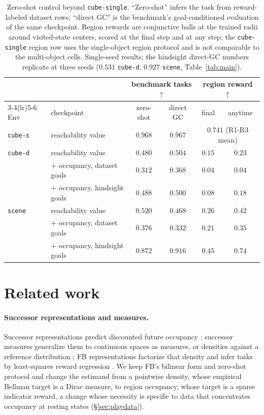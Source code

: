 \documentclass{article}
\begin{document}
\begin{table}[t]
\centering\small
\begin{tabular}{l l cc cc}
\toprule
& & \multicolumn{2}{c}{benchmark tasks $\uparrow$} & \multicolumn{2}{c}{region reward $\uparrow$} \\
\cmidrule(lr){3-4}\cmidrule(lr){5-6}
Env & checkpoint & zero-shot & direct GC & final & anytime \\
\midrule
\texttt{cube-s} & reachability value & $0.968$ & $0.967$ & \multicolumn{2}{c}{$0.741$ (R1-R3 mean)} \\
\midrule
\texttt{cube-d} & reachability value & $0.480$ & $0.504$ & $0.15$ & $0.23$ \\
& $+$ occupancy, dataset goals     & $0.312$ & $0.368$ & $0.04$ & $0.04$ \\
& $+$ occupancy, hindsight goals & $0.488$ & $0.500$ & $0.08$ & $0.18$ \\
\midrule
\texttt{scene} & reachability value & $0.520$ & $0.468$ & $0.26$ & $0.42$ \\
& $+$ occupancy, dataset goals     & $0.376$ & $0.332$ & $0.21$ & $0.35$ \\
& $+$ occupancy, hindsight goals & $\mathbf{0.872}$ & $0.916$ & $\mathbf{0.45}$ & $\mathbf{0.74}$ \\
\bottomrule
\end{tabular}
\caption{Zero-shot control beyond \texttt{cube-single}.
``Zero-shot'' infers the task from reward-labeled dataset rows; ``direct GC'' is the benchmark's goal-conditioned evaluation of the same checkpoint.
Region rewards are conjunctive balls at the trained radii around visited-state centers, scored at the final step and at any step; the \texttt{cube-single} region row uses the single-object region protocol and is not comparable to the multi-object cells.
Single-seed results; the hindsight direct-GC numbers replicate at three seeds ($0.531$ \texttt{cube-d}, $0.927$ \texttt{scene}, Table~\ref{tab:main}).}
\label{tab:multienv-zeroshot}
\end{table}

\section{Related work}
\label{sec:related}

\paragraph{Successor representations and measures.}
Successor representations predict discounted future occupancy \citep{dayan1993improving}; successor measures generalize them to continuous spaces as measures, or densities against a reference distribution \citep{blier2021learning}; FB representations factorize that density and infer tasks by least-squares reward regression \citep{touati2021learning,touati2023does}.
We keep FB's bilinear form and zero-shot protocol and change the estimand from a pointwise density, whose empirical Bellman target is a Dirac measure, to region occupancy, whose target is a sparse indicator reward, a change whose necessity is specific to data that concentrates occupancy at resting states (\S\ref{sec:playdata}).
\end{document}
